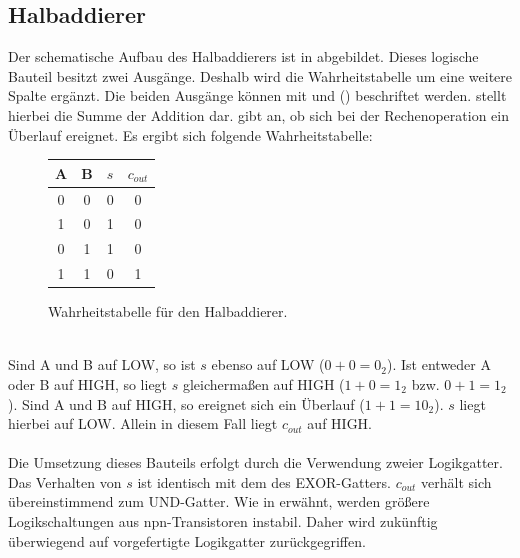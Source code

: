 \subsection{Halbaddierer}
Der schematische Aufbau des Halbaddierers ist in \cite{zimmermann1998binary} abgebildet. Dieses logische Bauteil besitzt zwei Ausgänge. Deshalb wird die Wahrheitstabelle um eine weitere Spalte ergänzt. Die beiden Ausgänge können mit  und  () beschriftet werden.  stellt hierbei die Summe der Addition dar.  gibt an, ob sich bei der Rechenoperation ein Überlauf ereignet. Es ergibt sich folgende Wahrheitstabelle:\\
\begin{figure}[h]
	\centering
	\hspace{1cm}
	\begin{tabular}{|c|c|c|c|}
		\hline
		\textbf{A} & \textbf{B} & \textbf{$s$} & \textbf{$c_{out}$} \\
		\hline
		0 & 0 & 0 & 0 \\
		1 & 0 & 1 & 0 \\
		0 & 1 & 1 & 0 \\
		1 & 1 & 0 & 1 \\
		\hline
	\end{tabular}
	\caption{Wahrheitstabelle für den Halbaddierer.}
\end{figure}\\
Sind A und B auf LOW, so ist $s$ ebenso auf LOW ($0+0=0_2$). Ist entweder A oder B auf HIGH, so liegt $s$ gleichermaßen auf HIGH ($1+0=1_2$ bzw. $0+1=1_2$). Sind A und B auf HIGH, so ereignet sich ein Überlauf ($1+1=10_2$). $s$ liegt hierbei auf LOW. Allein in diesem Fall liegt $c_{out}$ auf HIGH.\\\\
Die Umsetzung dieses Bauteils erfolgt durch die Verwendung zweier Logikgatter. Das Verhalten von $s$ ist identisch mit dem des EXOR-Gatters. $c_{out}$ verhält sich übereinstimmend zum UND-Gatter. Wie in  erwähnt, werden größere Logikschaltungen aus npn-Transistoren instabil. Daher wird zukünftig überwiegend auf vorgefertigte Logikgatter zurückgegriffen.\\
